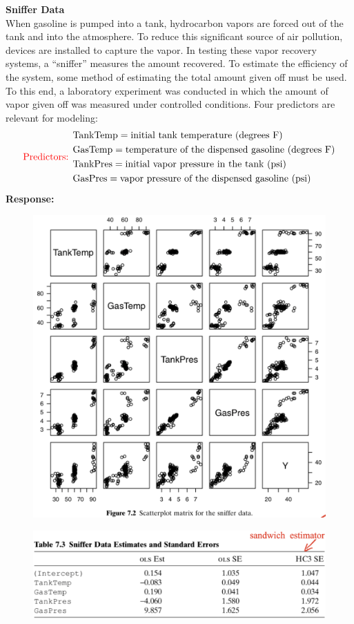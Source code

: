 \documentclass[14pt]{extarticle}
\begin{document}
\noindent
\textbf{Sniffer Data}\\
When gasoline is pumped into a tank, hydrocarbon vapors are forced out of the tank and into the atmosphere. To reduce this significant source of air pollution, devices are installed to capture the vapor. In testing these vapor recovery systems, a “sniffer” measures the amount recovered. To estimate the efficiency of the system, some method of estimating the total amount given off must be used. To this end, a laboratory experiment was conducted in which the amount of vapor given off was measured under controlled conditions. Four predictors are relevant for modeling:
\[
\textcolor{red}{\text{Predictors: }}
\begin{aligned}
    &\text{TankTemp} = \text{initial tank temperature (degrees F)} \\
    &\text{GasTemp} = \text{temperature of the dispensed gasoline (degrees F)} \\
    &\text{TankPres} = \text{initial vapor pressure in the tank (psi)} \\
    &\text{GasPres} = \text{vapor pressure of the dispensed gasoline (psi)}
\end{aligned}
\]
\textbf{Response:} 
\begin{figure}[H]
    \centering
    \includegraphics[width=1\textwidth]{fig8.png}
\end{figure} 
\begin{figure}[H]
    \centering
    \includegraphics[width=1\textwidth]{fig9.png}
\end{figure} 
\end{document}
